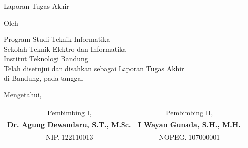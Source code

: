 \clearpage
\pagestyle{empty}

\begin{center}
  \smallskip

  \large \bfseries \MakeUppercase{\thetitle}
  \vfill

  \large Laporan Tugas Akhir
  \vfill

  \normalsize Oleh

  \large \MakeUppercase{\theauthor}

  \large Program Studi Teknik Informatika \\

  \normalsize \normalfont
  Sekolah Teknik Elektro dan Informatika \\
  Institut Teknologi Bandung \\

  \vfill
  \normalsize \normalfont
  Telah disetujui dan disahkan sebagai Laporan Tugas Akhir \\
  di Bandung, pada tanggal \tanggalpengesahan

  \vspace{0.5cm}
  Mengetahui,

  \vspace{1cm}
  \begin{center}
    \begin{tabular*}{\textwidth}{@{\extracolsep{\fill}}cc}
      Pembimbing I, & Pembimbing II, \\[3cm]
      \textbf{Dr. Agung Dewandaru, S.T., M.Sc.} & \textbf{I Wayan Gunada, S.H., M.H.} \\
      NIP. 122110013                            & NOPEG. 107000001
    \end{tabular*}
  \end{center}

\end{center}
\clearpage
